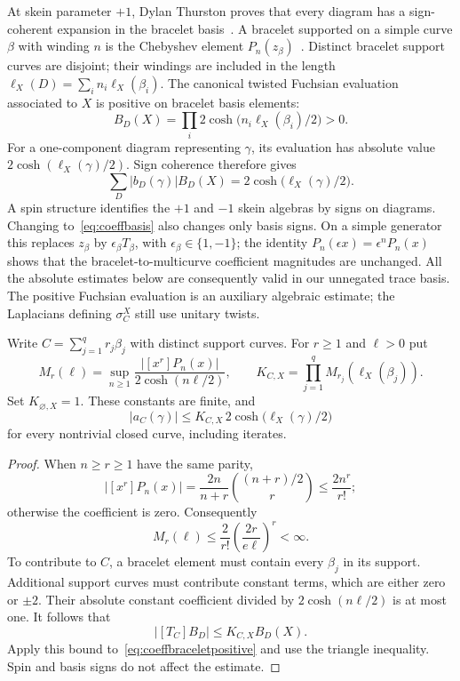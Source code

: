 At skein parameter $+1$, Dylan Thurston proves that every diagram
has a sign-coherent expansion in the bracelet
basis~\cite[Theorem 2]{DThurstonPositive}. A bracelet supported on
a simple curve $\beta$ with winding $n$ is the Chebyshev element
$P_n(z_\beta)$~\cite[Proposition 4.4]{DThurstonPositive}.
Distinct bracelet support curves are disjoint; their windings are
included in the length $\ell_X(D)=\sum_i n_i\ell_X(\beta_i)$.
The canonical twisted Fuchsian evaluation associated to $X$ is
positive on bracelet basis elements:
\[
 B_D(X)=\prod_i2\cosh\bigl(n_i\ell_X(\beta_i)/2\bigr)>0.
\]
For a one-component diagram representing $\gamma$, its evaluation
has absolute value $2\cosh(\ell_X(\gamma)/2)$. Sign coherence
therefore gives
\begin{equation}
 \sum_D |b_D(\gamma)| B_D(X)
 =2\cosh\bigl(\ell_X(\gamma)/2\bigr).
 \label{eq:coeffbraceletpositive}
\end{equation}
A spin structure identifies the $+1$ and $-1$ skein algebras by
signs on diagrams. Changing to~\eqref{eq:coeffbasis} also changes
only basis signs. On a simple generator this replaces $z_\beta$ by
$\epsilon_\beta T_\beta$, with $\epsilon_\beta\in\{1,-1\}$;
the identity $P_n(\epsilon x)=\epsilon^nP_n(x)$ shows that the
bracelet-to-multicurve coefficient magnitudes are unchanged.
All the absolute estimates below are consequently
valid in our unnegated trace basis. The positive Fuchsian evaluation
is an auxiliary algebraic estimate; the Laplacians defining
$\sigma_C^X$ still use unitary twists.

\begin{proposition}
\label{prop:coeffgrowth}
Write $C=\sum_{j=1}^q r_j\beta_j$ with distinct support curves.
For $r\geq1$ and $\ell>0$ put
\[
 M_r(\ell)=\sup_{n\geq1}
 \frac{|[x^r]P_n(x)|}{2\cosh(n\ell/2)},\qquad
 K_{C,X}=\prod_{j=1}^q M_{r_j}(\ell_X(\beta_j)).
\]
Set $K_{\varnothing,X}=1$. These constants are finite, and
\begin{equation}
 \boxed{
 |a_C(\gamma)|\leq
 K_{C,X}\,2\cosh\bigl(\ell_X(\gamma)/2\bigr)
 }
 \label{eq:coeffexponentialbound}
\end{equation}
for every nontrivial closed curve, including iterates.
\end{proposition}

\begin{proof}
When $n\geq r\geq1$ have the same parity,
\[
 |[x^r]P_n(x)|
 =\frac{2n}{n+r}\binom{(n+r)/2}{r}
 \leq\frac{2n^r}{r!};
\]
otherwise the coefficient is zero. Consequently
\begin{equation}
 M_r(\ell)\leq
 \frac{2}{r!}\left(\frac{2r}{e\ell}\right)^r<\infty.
 \label{eq:coeffMrbound}
\end{equation}
To contribute to $C$, a bracelet element must contain every
$\beta_j$ in its support. Additional support curves must contribute
constant terms, which are either zero or $\pm2$. Their absolute
constant coefficient divided by $2\cosh(n\ell/2)$ is at most one.
It follows that
\[
 |[T_C]B_D|\leq K_{C,X}B_D(X).
\]
Apply this bound to~\eqref{eq:coeffbraceletpositive} and use the
triangle inequality. Spin and basis signs do not affect the estimate.
\end{proof}

